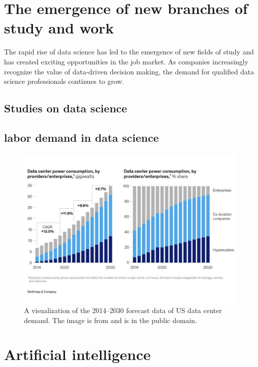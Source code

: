 \documentclass{vgtc}                          %
\begin{document}
\section{The emergence of new branches of study and work}

The rapid rise of data science has led to the emergence of new fields of study and has created exciting opportunities in the job market. As 
companies increasingly recognize the value of data-driven decision making, the demand for qualified data science professionals continues to grow.
 
\subsection{Studies on data science}


\subsection{labor demand in data science}

\begin{figure}[tb]
  \centering %
  \includegraphics[width=\columnwidth]{datacenter_demand}
  \caption{A visualization of the 2014--2030 forecast data of US data center demand. The image is from \cite{Bangalore:2023} and is in the public domain.}
  \label{fig:sample}
 \end{figure}

\section{Artificial intelligence}
\end{document}

